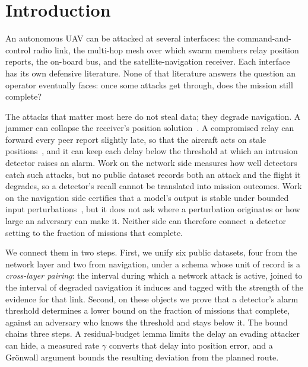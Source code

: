 \section{Introduction}
\label{sec:intro}
An autonomous UAV can be attacked at several interfaces: the command-and-control
radio link, the multi-hop mesh over which swarm members relay position reports,
the on-board bus, and the satellite-navigation receiver. Each interface has its
own defensive literature. None of that literature answers the question an
operator eventually faces: once some attacks get through, does the mission still
complete?

The attacks that matter most here do not steal data; they degrade navigation. A
jammer can collapse the receiver's position solution~\cite{kassas2022jammer}. A
compromised relay can forward every peer report slightly late, so that the
aircraft acts on stale positions~\cite{datamut2026,lou2019timedelay}, and it can
keep each delay below the threshold at which an intrusion detector raises an
alarm. Work on the network side measures how well detectors catch such attacks,
but no public dataset records both an attack and the flight it degrades, so a
detector's recall cannot be translated into mission outcomes. Work on the
navigation side certifies that a model's output is stable under bounded input
perturbations~\cite{cohen2019smoothing}, but it does not ask where a
perturbation originates or how large an adversary can make it. Neither side can
therefore connect a detector setting to the fraction of missions that complete.

We connect them in two steps. First, we unify six public datasets, four from the
network layer and two from navigation, under a schema whose unit of record is a
\emph{cross-layer pairing}: the interval during which a network attack is
active, joined to the interval of degraded navigation it induces and tagged with
the strength of the evidence for that link. Second, on these objects we prove
that a detector's alarm threshold determines a lower bound on the fraction of
missions that complete, against an adversary who knows the threshold and stays
below it. The bound chains three steps. A residual-budget lemma limits the delay
an evading attacker can hide, a measured rate $\gamma$ converts that delay into
position error, and a Gr\"onwall argument bounds the resulting deviation from
the planned route.

